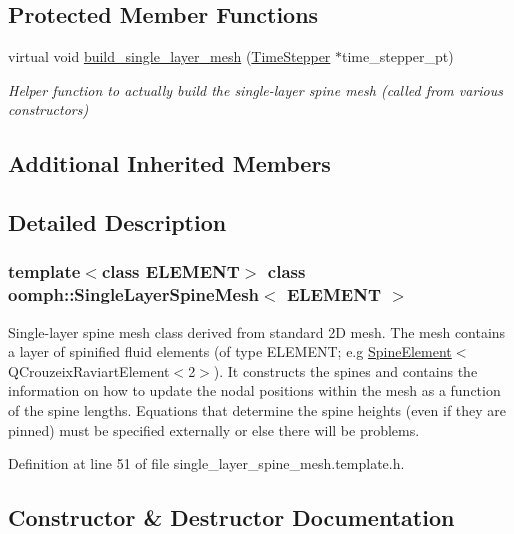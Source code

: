 \subsection*{Protected Member Functions}
\begin{DoxyCompactItemize}
\item 
virtual void \hyperlink{classoomph_1_1SingleLayerSpineMesh_a6829fa8216137c0e2f5eb40b389dda35}{build\+\_\+single\+\_\+layer\+\_\+mesh} (\hyperlink{classoomph_1_1TimeStepper}{Time\+Stepper} $\ast$time\+\_\+stepper\+\_\+pt)
\begin{DoxyCompactList}\small\item\em Helper function to actually build the single-\/layer spine mesh (called from various constructors) \end{DoxyCompactList}\end{DoxyCompactItemize}
\subsection*{Additional Inherited Members}


\subsection{Detailed Description}
\subsubsection*{template$<$class E\+L\+E\+M\+E\+NT$>$\newline
class oomph\+::\+Single\+Layer\+Spine\+Mesh$<$ E\+L\+E\+M\+E\+N\+T $>$}

Single-\/layer spine mesh class derived from standard 2D mesh. The mesh contains a layer of spinified fluid elements (of type E\+L\+E\+M\+E\+NT; e.\+g \hyperlink{classoomph_1_1SpineElement}{Spine\+Element}$<$Q\+Crouzeix\+Raviart\+Element$<$2$>$). It constructs the spines and contains the information on how to update the nodal positions within the mesh as a function of the spine lengths. Equations that determine the spine heights (even if they are pinned) must be specified externally or else there will be problems. 

Definition at line 51 of file single\+\_\+layer\+\_\+spine\+\_\+mesh.\+template.\+h.



\subsection{Constructor \& Destructor Documentation}
\mbox{\label{classoomph_1_1SingleLayerSpineMesh_a2cdbf36114a4da773fb7d659218d09cb}} 
